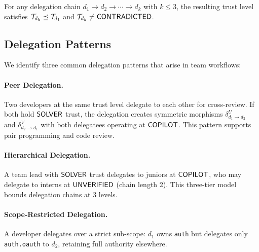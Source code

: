 \documentclass[11pt]{article}
\begin{document}
\begin{proposition}
For any delegation chain $d_1 \to d_2 \to \cdots \to d_k$ with $k \leq 3$,
the resulting trust level satisfies $\mathcal{T}_{d_k} \preceq \mathcal{T}_{d_1}$ and
$\mathcal{T}_{d_k} \neq \mathsf{CONTRADICTED}$.
\end{proposition}

\subsection{Delegation Patterns}\label{sec:deleg-patterns}

We identify three common delegation patterns that arise in team workflows:

\paragraph{Peer Delegation.}
Two developers at the same trust level delegate to each other for cross-review.
If both hold $\mathsf{SOLVER}$ trust, the delegation creates symmetric morphisms
$\delta_{d_1 \to d_2}^U$ and $\delta_{d_2 \to d_1}^V$ with both delegatees
operating at $\mathsf{COPILOT}$. This pattern supports pair programming and code
review.

\paragraph{Hierarchical Delegation.}
A team lead with $\mathsf{SOLVER}$ trust delegates to juniors at $\mathsf{COPILOT}$, who may
delegate to interns at $\mathsf{UNVERIFIED}$ (chain length 2). This three-tier model bounds
delegation chains at 3 levels.

\paragraph{Scope-Restricted Delegation.}
A developer delegates over a strict sub-scope: $d_1$ owns \texttt{auth} but
delegates only \texttt{auth.oauth} to $d_2$, retaining full authority elsewhere.
\end{document}
